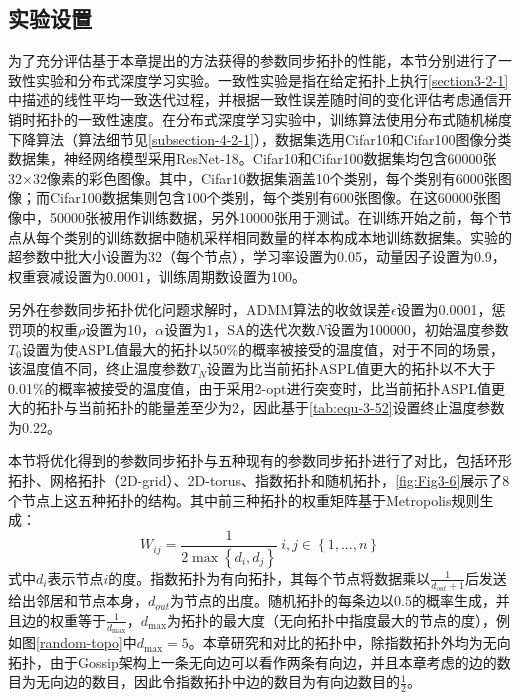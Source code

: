 \subsection{实验设置}
为了充分评估基于本章提出的方法获得的参数同步拓扑的性能，本节分别进行了一致性实验和分布式深度学习实验。一致性实验是指在给定拓扑上执行\autoref{section3-2-1}中描述的线性平均一致迭代过程，并根据一致性误差随时间的变化评估考虑通信开销时拓扑的一致性速度。在分布式深度学习实验中，训练算法使用分布式随机梯度下降算法（算法细节见\autoref{subsection-4-2-1}），数据集选用Cifar10和Cifar100图像分类数据集，神经网络模型采用ResNet-18。Cifar10和Cifar100数据集均包含60000张32×32像素的彩色图像。其中，Cifar10数据集涵盖10个类别，每个类别有6000张图像；而Cifar100数据集则包含100个类别，每个类别有600张图像。在这60000张图像中，50000张被用作训练数据，另外10000张用于测试。在训练开始之前，每个节点从每个类别的训练数据中随机采样相同数量的样本构成本地训练数据集。实验的超参数中批大小设置为32（每个节点），学习率设置为0.05，动量因子设置为0.9，权重衰减设置为0.0001，训练周期数设置为100。

另外在参数同步拓扑优化问题求解时，ADMM算法的收敛误差$\epsilon$设置为0.0001，惩罚项的权重$\rho$设置为10，$\alpha$设置为1，SA的迭代次数$N$设置为100000，初始温度参数$T_0$设置为使ASPL值最大的拓扑以50\%的概率被接受的温度值，对于不同的场景，该温度值不同，终止温度参数$T_N$设置为比当前拓扑ASPL值更大的拓扑以不大于0.01\%的概率被接受的温度值，由于采用2-opt进行突变时，比当前拓扑ASPL值更大的拓扑与当前拓扑的能量差至少为2，因此基于\autoref{tab:equ-3-52}设置终止温度参数为0.22。

本节将优化得到的参数同步拓扑与五种现有的参数同步拓扑进行了对比，包括环形拓扑、网格拓扑（2D-grid）、2D-torus、指数拓扑和随机拓扑，\autoref{fig:Fig3-6}展示了8个节点上这五种拓扑的结构。其中前三种拓扑的权重矩阵基于Metropolis规则\cite{nedic2018network}生成：
\begin{equation}
    \label{tab:equ-3-54}
    W_{ij}=\frac{1}{2\max \left\{ d_i,d_j \right\}} \ i,j\in \left\{ 1,...,n \right\} 
\end{equation}
式中$d_i$表示节点$i$的度。指数拓扑为有向拓扑，其每个节点将数据乘以$\frac{1}{d_{out}+1}$后发送给出邻居和节点本身，$d_{out}$为节点的出度。随机拓扑的每条边以0.5的概率生成，并且边的权重等于$\frac{1}{d_{\max}}$，$d_{\max}$为拓扑的最大度（无向拓扑中指度最大的节点的度），例如图\autoref{random-topo}中$d_{\max}=5$。本章研究和对比的拓扑中，除指数拓扑外均为无向拓扑，由于Gossip架构上一条无向边可以看作两条有向边，并且本章考虑的边的数目为无向边的数目，因此令指数拓扑中边的数目为有向边数目的$\frac{1}{2}$。

